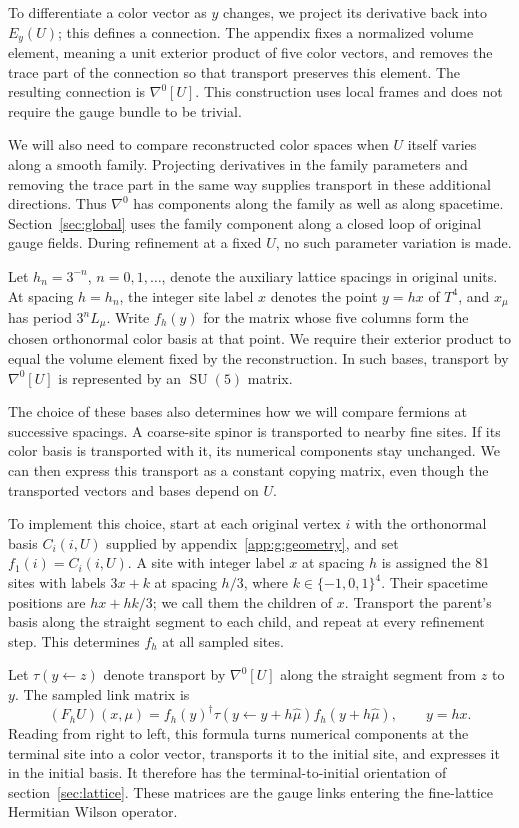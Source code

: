 \documentclass[11pt,a4paper]{article}
\theoremstyle{remark}
\DeclareMathOperator{\SU}{SU}
\begin{document}
To differentiate a color vector as $y$ changes, we project
its derivative back into $E_y(U)$; this defines a connection. The appendix
fixes a normalized volume element, meaning a unit exterior product of five
color vectors, and removes the trace part of the connection so that
transport preserves this element. The resulting connection is $\nabla^0[U]$.
This construction uses local frames and does not require the gauge bundle
to be trivial.

We will also need to compare reconstructed color spaces when $U$ itself
varies along a smooth family. Projecting derivatives in the family
parameters and removing the trace part in the same way supplies transport
in these additional directions. Thus $\nabla^0$ has components along the
family as well as along spacetime. Section~\ref{sec:global} uses the family
component along a closed loop of original gauge fields. During refinement
at a fixed $U$, no such parameter variation is made.

Let $h_n=3^{-n}$, $n=0,1,\ldots$, denote the auxiliary lattice spacings in
original units. At spacing $h=h_n$, the integer site label $x$ denotes the
point $y=hx$ of $T^4$, and $x_\mu$ has period $3^nL_\mu$. Write $f_h(y)$
for the matrix whose five columns form the chosen orthonormal color basis
at that point. We require their exterior product to equal the volume
element fixed by the reconstruction. In such bases, transport by
$\nabla^0[U]$ is represented by an $\SU(5)$ matrix.

The choice of these bases also determines how we will compare fermions at
successive spacings. A coarse-site spinor is transported to nearby fine
sites. If its color basis is transported with it, its numerical components
stay unchanged. We can then express this transport as a constant copying
matrix, even though the transported vectors and bases depend on $U$.

To implement this choice, start at each original vertex $i$ with the
orthonormal basis $C_i(i,U)$ supplied by appendix~\ref{app:g:geometry}, and
set $f_1(i)=C_i(i,U)$. A site with integer label $x$ at spacing $h$ is
assigned the 81 sites with labels $3x+k$ at spacing $h/3$, where
$k\in\{-1,0,1\}^4$. Their spacetime positions are $hx+hk/3$; we call them
the children of $x$. Transport the parent's basis along the straight
segment to each child, and repeat at every refinement step. This determines
$f_h$ at all sampled sites.

Let $\tau(y\leftarrow z)$ denote transport by $\nabla^0[U]$ along the
straight segment from $z$ to $y$. The sampled link matrix is
\begin{equation}
 (F_hU)(x,\mu)
 =f_h(y)^\dagger
       \tau(y\leftarrow y+h\hat\mu)f_h(y+h\hat\mu),
 \qquad y=hx.
 \label{eq:sampled-link-field}
\end{equation}
Reading from right to left, this formula turns numerical components at the
terminal site into a color vector, transports it to the initial site, and
expresses it in the initial basis. It therefore has the terminal-to-initial
orientation of section~\ref{sec:lattice}. These matrices are the gauge
links entering the fine-lattice Hermitian Wilson operator.
\end{document}

